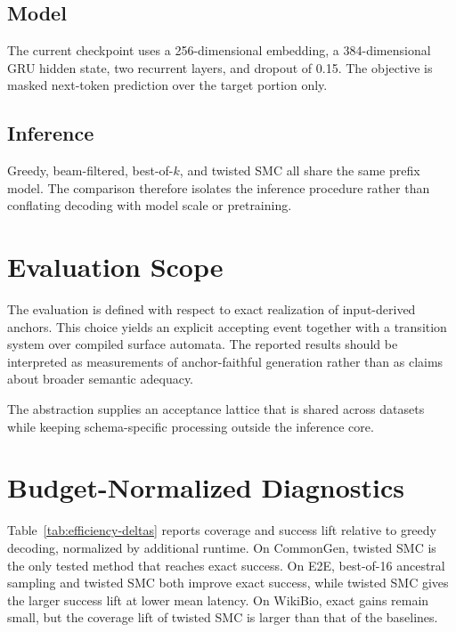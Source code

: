\documentclass[11pt]{article}
\begin{document}
\subsection{Model}
The current checkpoint uses a 256-dimensional embedding, a 384-dimensional GRU hidden state, two recurrent layers, and dropout of 0.15. The objective is masked next-token prediction over the target portion only.

\subsection{Inference}
Greedy, beam-filtered, best-of-$k$, and twisted SMC all share the same prefix model. The comparison therefore isolates the inference procedure rather than conflating decoding with model scale or pretraining.

\section{Evaluation Scope}
The evaluation is defined with respect to exact realization of input-derived anchors. This choice yields an explicit accepting event together with a transition system over compiled surface automata. The reported results should be interpreted as measurements of anchor-faithful generation rather than as claims about broader semantic adequacy.

The abstraction supplies an acceptance lattice that is shared across datasets while keeping schema-specific processing outside the inference core.

\section{Budget-Normalized Diagnostics}
Table~\ref{tab:efficiency-deltas} reports coverage and success lift relative to greedy decoding, normalized by additional runtime. On CommonGen, twisted SMC is the only tested method that reaches exact success. On E2E, best-of-16 ancestral sampling and twisted SMC both improve exact success, while twisted SMC gives the larger success lift at lower mean latency. On WikiBio, exact gains remain small, but the coverage lift of twisted SMC is larger than that of the baselines.
\end{document}
